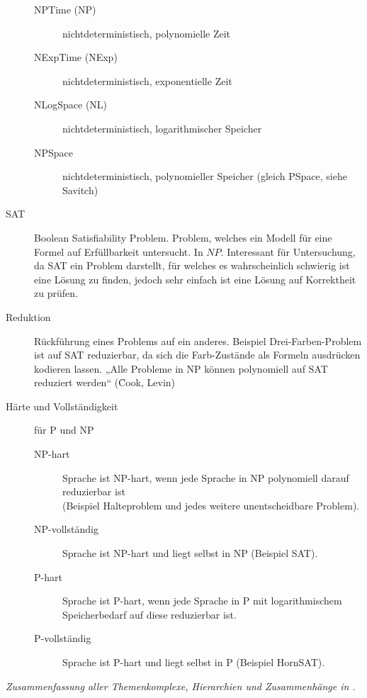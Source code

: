 \begin{description}
\begin{description}
            \item[NPTime (NP)] nichtdeterministisch, polynomielle Zeit
            \item[NExpTime (NExp)] nichtdeterministisch, exponentielle Zeit
            \item[NLogSpace (NL)] nichtdeterministisch, logarithmischer Speicher
            \item[NPSpace] nichtdeterministisch, polynomieller Speicher (gleich PSpace, siehe Savitch)
        \end{description}

    \item[SAT] Boolean Satisfiability Problem. Problem, welches ein Modell für eine Formel auf Erfüllbarkeit untersucht. In $NP$.
        Interessant für Untersuchung, da SAT ein Problem darstellt, für welches es wahrscheinlich schwierig ist eine Lösung zu finden,
        jedoch sehr einfach ist eine Lösung auf Korrektheit zu prüfen. 

    \item[Reduktion] Rückführung eines Problems auf ein anderes. Beispiel Drei-Farben-Problem ist auf SAT reduzierbar, da sich die Farb-Zustände als
        Formeln ausdrücken kodieren lassen. „Alle Probleme in NP können polynomiell auf SAT reduziert werden“ (\f{Cook, Levin})

    \item[Härte und Vollständigkeit] für P und NP 
        \begin{description}
            \item[NP-hart] Sprache ist NP-hart, wenn jede Sprache in NP polynomiell darauf reduzierbar ist \\
                (Beispiel Halteproblem und jedes weitere unentscheidbare Problem).
            \item[NP-vollständig] Sprache ist NP-hart und liegt selbst in NP (Beispiel SAT).

            \item[P-hart] Sprache ist P-hart, wenn jede Sprache in P mit logarithmischem Speicherbedarf auf diese reduzierbar ist.
            \item[P-vollständig] Sprache ist P-hart und liegt selbst in P (Beispiel HornSAT).
        \end{description}
\end{description}

\textit{Zusammenfassung aller Themenkomplexe, Hierarchien und Zusammenhänge in .}

